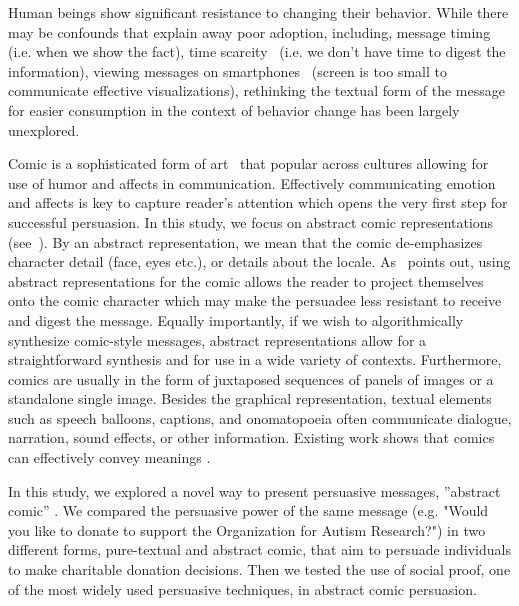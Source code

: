 Human beings show significant resistance to changing their behavior. While there may be confounds that explain away poor adoption, including, message timing~\cite{Fogg2009} (i.e. when we show the fact), time scarcity~\cite{Janssen2016} (i.e. we don't have time to digest the information), viewing messages on smartphones~\cite{Kim2016} (screen is too small to communicate effective visualizations), rethinking the textual form of the message for easier consumption in the context of behavior change has been largely unexplored.  
 
Comic is a sophisticated form of art~\cite{scott1993understanding} that popular across cultures allowing for use of humor and affects in communication. Effectively communicating emotion and affects is key to capture reader's attention which opens the very first step for successful persuasion. In this study, we focus on abstract comic representations (see~). By an abstract representation, we mean that the comic de-emphasizes character detail (face, eyes etc.), or details about the locale. As~\textcite{scott1993understanding} points out, using abstract representations for the comic allows the reader to project themselves onto the comic character which may make the persuadee less resistant to receive and digest the message. Equally importantly, if we wish to algorithmically synthesize comic-style messages, abstract representations allow for a straightforward synthesis and for use in a wide variety of contexts. Furthermore, comics are usually in the form of juxtaposed sequences of panels of images or a standalone single image. Besides the graphical representation, textual elements such as speech balloons, captions, and onomatopoeia often communicate dialogue, narration, sound effects, or other information. Existing work shows that comics can effectively convey meanings \cite{McDermottPB18,cary2004going,scott1993understanding}.

In this study, we explored a novel way to present persuasive messages, ''abstract comic'' . We compared the persuasive power of the same message (e.g. "Would you like to donate to support the Organization for Autism Research?") in two different forms, pure-textual and abstract comic, that aim to persuade individuals to make charitable donation decisions. Then we tested the use of social proof, one of the most widely used persuasive techniques, in abstract comic persuasion. 

